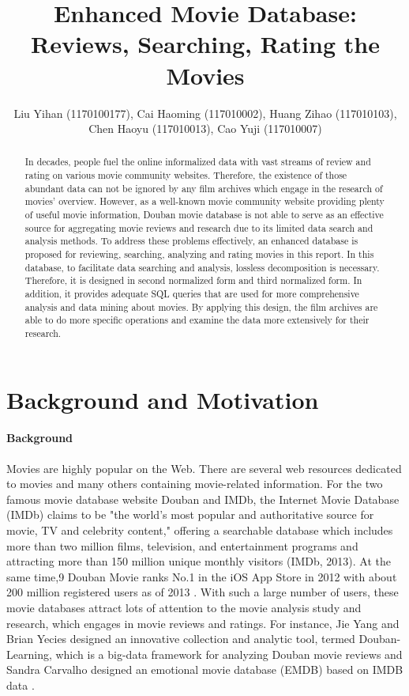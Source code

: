 \documentclass[a4paper]{article}
\title{\textbf{Enhanced Movie Database:\\ Reviews, Searching, Rating the Movies}}
\author{Liu Yihan (1170100177), Cai Haoming (117010002), Huang Zihao (117010103), \\Chen Haoyu (117010013), Cao Yuji (117010007)}
\begin{document}
\date{}
\maketitle

\begin{abstract}
In decades, people fuel the online informalized data with vast streams of review and rating on various movie community websites. Therefore, the existence of those abundant data can not be ignored by any film archives which engage in the research of movies' overview. However, as a well-known movie community website providing plenty of useful movie information, Douban movie database is not able to serve as an effective source for aggregating movie reviews and research due to its limited data search and analysis methods. To address these problems effectively, an enhanced database is proposed for reviewing, searching, analyzing and rating movies in this report. In this database, to facilitate data searching and analysis, lossless decomposition is necessary. Therefore, it is designed in second normalized form and third normalized form. In addition, it provides adequate SQL queries that are used for more comprehensive analysis and data mining about movies. By applying this design, the film archives are able to do more specific operations and examine the data more extensively for their research.

\end{abstract}
\section{Background and Motivation}
\paragraph{Background}Movies are highly popular on the Web. There are several web resources dedicated to movies and many others containing movie-related information. For the two famous movie database website Douban and IMDb, the Internet Movie Database (IMDb) claims to be "the world's most popular and authoritative source for movie, TV and celebrity content," offering a searchable database which includes more than two million films, television, and entertainment programs and attracting more than 150 million unique monthly visitors (IMDb, 2013). At the same time,9 Douban Movie ranks No.1 in the iOS App Store in 2012 with about 200 million registered users as of 2013 \cite{Alexa}. With such a large number of users, these movie databases attract lots of attention to the movie analysis study and research, which engages in movie reviews and ratings. For instance, Jie Yang and Brian Yecies designed an innovative collection and analytic tool, termed Douban-Learning, which is a big-data framework for analyzing Douban movie reviews \cite{yang2016mining} and Sandra Carvalho designed an emotional movie database (EMDB) based on IMDB data \cite{carvalho2012emotional}.
\end{document}
